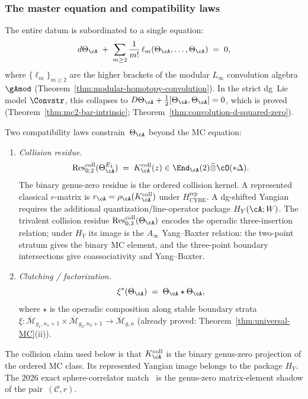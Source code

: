 \subsubsection{The master equation and compatibility laws}

The entire datum is subordinated to a single equation:
\begin{equation}\label{eq:holographic-master-equation}
d\Theta_\cA
\;+\;
\sum_{m \ge 2} \frac{1}{m!}\,
\ell_m(\Theta_\cA, \dotsc, \Theta_\cA)
\;=\; 0,
\end{equation}
where $\{\ell_m\}_{m \ge 2}$ are the higher brackets of the
modular $L_\infty$ convolution algebra~$\gAmod$
(Theorem~\ref{thm:modular-homotopy-convolution}). In the strict dg~Lie
model $\Convstr$, this collapses to
$D\Theta_\cA + \tfrac{1}{2}[\Theta_\cA,\Theta_\cA] = 0$,
which is proved (Theorem~\ref{thm:mc2-bar-intrinsic};
Theorem~\ref{thm:convolution-d-squared-zero}).

Two compatibility laws constrain~$\Theta_\cA$ beyond the MC equation:
\begin{enumerate}[label=\textup{(\alph*)}]
\item \emph{Collision residue.}
\begin{equation}\label{eq:collision-residue-identification}
\operatorname{Res}^{\mathrm{coll}}_{0,2}(\Theta_\cA^{E_1})
\;=\;K_\cA^{\mathrm{coll}}(z)
\in\End_\cA(2)\widehat\otimes\cO(*\Delta).
\end{equation}
The binary genus-zero residue is the ordered collision kernel.  A
represented classical $r$-matrix is
$r_\cA=\rho_\cA(K_\cA^{\mathrm{coll}})$ under
$H_{\mathrm{CYBE}}^{\mathrm{rep}}$.  A dg-shifted Yangian requires
the additional quantization/line-operator package $H_Y(\cA;W)$.
The trivalent collision residue
$\operatorname{Res}^{\mathrm{coll}}_{0,3}(\Theta_\cA)$
encodes the operadic three-insertion relation; under $H_Y$ its image
is the $A_\infty$ Yang--Baxter relation:
the two-point stratum gives the binary MC element, and the
three-point boundary intersections give coassociativity and
Yang--Baxter.
\item \emph{Clutching / factorization.}
\begin{equation}\label{eq:clutching-factorization-frontier}
\xi^*(\Theta_\cA)
\;=\;
\Theta_\cA \star \Theta_\cA,
\end{equation}
where $\star$ is the operadic composition along stable boundary
strata $\xi\colon \overline{\mathcal{M}}_{g_1,n_1+1} \times
\overline{\mathcal{M}}_{g_2,n_2+1} \to \overline{\mathcal{M}}_{g,n}$
(already proved: Theorem~\ref{thm:universal-MC}(ii)).
\end{enumerate}
The collision claim used below is that
$K_\cA^{\mathrm{coll}}$ is the binary genus-zero projection of the
ordered MC class.  Its represented Yangian image belongs to the
package $H_Y$. The 2026 exact sphere-correlator
match~\cite{GZ26} is the genus-zero matrix-element shadow of the
pair~$(\mathcal{C}, r)$.

